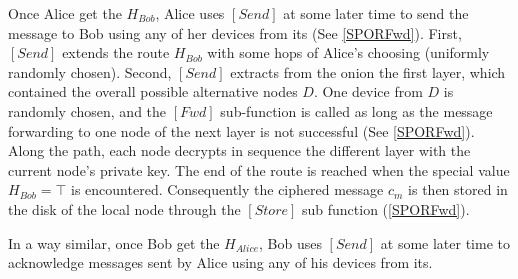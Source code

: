 
Once Alice get the \(H_{Bob}\), Alice uses \([Send]\) at some
later time to send the message to Bob using any of her devices from
its \squad (See \cref{SPORFwd}). First, \([Send]\) extends the route
\(H_{Bob}\) with some hops of Alice's choosing (uniformly randomly
chosen). Second, \([Send]\) extracts from the onion the first
layer, which contained the overall
possible alternative nodes $D$.
One device from $D$ is randomly chosen, and the \([Fwd]\)
sub-function is called as long as the message forwarding to one node of
the next layer is not successful (See \cref{SPORFwd}). Along the path, each node decrypts
in sequence the different layer with the current node’s private key. 
The end of the route is reached when the special value \(H_{Bob} = \top\) is
encountered. Consequently the ciphered message \(c_m\) is then stored
in the disk of the local node through the \([Store]\) sub function 
(\cref{SPORFwd}).

In a way similar, once Bob get the \(H_{Alice}\), Bob uses \([Send]\) at some
later time to acknowledge messages sent by Alice using any of his devices from
its\squad.





 

